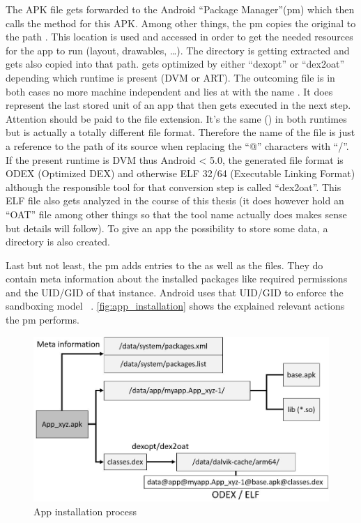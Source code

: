 The APK file gets forwarded to the Android ``Package Manager''(pm)
which then calls the  method for this
APK. Among other things, the pm copies the original 
to the path .
This location is used and accessed in order to get the
needed resources for the app to run (layout, drawables, \ldots).
The  directory is getting extracted and gets also copied
into that path.  gets optimized by either ``dexopt''
or ``dex2oat'' depending which runtime is present (DVM or ART).
The outcoming file is in both cases no more machine independent
and lies at  with the name
.
It does represent the last stored unit of an app that then
gets executed in the next step.
Attention should be paid to the file extension.
It's the same () in both runtimes but is actually a totally
different file format.
Therefore the name of the file is just a reference to the path
of its source when replacing the ``@'' characters with ``/''.
If the present runtime is DVM thus Android < 5.0, the generated
file format is ODEX (Optimized DEX) and otherwise
ELF 32/64 (Executable Linking Format) although the responsible
tool for that conversion step is called ``dex2oat''. This ELF
file also gets analyzed in the course of this thesis
(it does however hold an ``OAT'' file among other things so that
the tool name actually does makes sense but details will follow).
To give an app the possibility to
store some data, a  directory is
also created.

Last but not least, the pm adds entries to the
 as well as the
 files. They do contain
meta information about the installed packages like
required permissions and the UID/GID of that instance.
Android uses that UID/GID to enforce the sandboxing model
~\parencite{securityinternals}.
\autoref{fig:app_installation} shows the explained
relevant actions the pm performs.

\begin{figure}[htb]
  \includegraphics[width=\textwidth]{figures/app_installation}
  \caption[App installation process]{App installation process}
  \label{fig:app_installation}
\end{figure}

